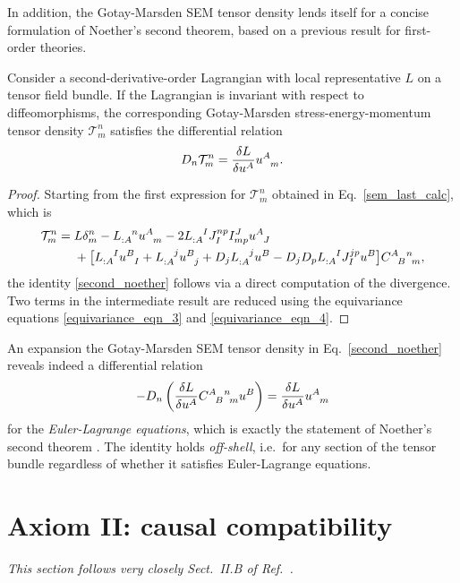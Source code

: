 In addition, the Gotay-Marsden SEM tensor density lends itself for a concise formulation of Noether's second theorem, based on a previous result \cite{goma} for first-order theories.
\begin{theorem}\label{thm_second_noether}
  Consider a second-derivative-order Lagrangian with local representative $L$ on a tensor field bundle. If the Lagrangian is invariant with respect to diffeomorphisms, the corresponding Gotay-Marsden stress-energy-momentum tensor density $\mathcal T^n_m$ satisfies the differential relation
  \begin{equation}\label{second_noether}
    D_n \mathcal T^n_m = \frac{\delta L}{\delta u^A} u^A_{\hphantom Am}.
  \end{equation}
\end{theorem}
\begin{proof}
  Starting from the first expression for $\mathcal T^n_m$ obtained in Eq.~\eqref{sem_last_calc}, which is
  \begin{equation}
    \begin{aligned}
      \mathcal T^n_m = {} & L\delta^n_m - L_{:A}^{\hphantom{:A}n}u^A_{\hphantom Am} - 2 L_{:A}^{\hphantom{:A}I}J_I^{np} I^J_{mp} u^A_{\hphantom AJ} \\
      {} & + \big\lbrack L_{:A}^{\hphantom{:A}I}u^B_{\hphantom BI} + L_{:A}^{\hphantom{:A}j}u^B_{\hphantom Bj} + D_j L_{:A}^{\hphantom{:A}j}u^B - D_j D_p L_{:A}^{\hphantom{:A}I}J_I^{jp} u^B \big\rbrack\gmc{A}{B}{n}{m},
    \end{aligned}
  \end{equation}
  the identity \eqref{second_noether} follows via a direct computation of the divergence. Two terms in the intermediate result are reduced using the equivariance equations \eqref{equivariance_eqn_3} and \eqref{equivariance_eqn_4}.
\end{proof}
An expansion the Gotay-Marsden SEM tensor density in Eq.~\eqref{second_noether} reveals indeed a differential relation
\begin{equation}
  -D_n \left(\frac{\delta L}{\delta u^A}\gmc{A}{B}{n}{m}u^B\right) = \frac{\delta L}{\delta u^A} u^A_{\hphantom Am}
\end{equation}
for the \emph{Euler-Lagrange equations}, which is exactly the statement of Noether's second theorem \cite{}. The identity holds \emph{off-shell}, i.e.~for any section of the tensor bundle regardless of whether it satisfies Euler-Lagrange equations.

\section{Axiom II: causal compatibility}
\textit{This section follows very closely Sect.~II.B of Ref.~\cite{ccg paper}.}


